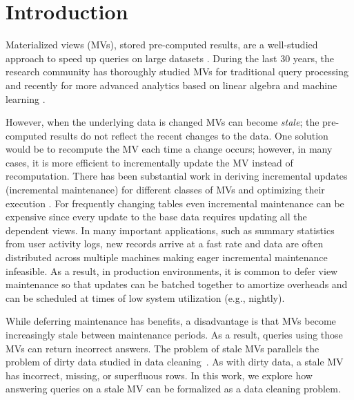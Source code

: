 \vspace{-0.5em}
\section{Introduction}
Materialized views (MVs), stored pre-computed results, are a well-studied approach to speed up queries on large datasets \cite{LarsonY85, gupta1995maintenance, chirkova2011materialized}.
During the last 30 years, the research community has thoroughly studied MVs for traditional query processing and recently for more advanced analytics based on linear algebra and machine learning \cite{nikolic2014linview, zhang2014mat}.

However, when the underlying data is changed MVs can become \emph{stale}; the pre-computed results do not reflect the recent changes to the data. 
One solution would be to recompute the MV each time a change occurs; however, in many cases, it is more efficient to incrementally update the MV instead of recomputation.
There has been substantial work in deriving incremental updates (incremental maintenance) for different classes of MVs and optimizing their execution \cite{chirkova2011materialized, DBLP:journals/vldb/KochAKNNLS14}.
For frequently changing tables even incremental maintenance can be expensive since every update to the base data requires updating all the dependent views.  
In many important applications, such as summary statistics from user activity logs, new records arrive at a fast rate and data are often distributed across multiple machines making eager incremental maintenance infeasible. 
As a result, in production environments, it is common to defer view maintenance \cite{chirkova2011materialized, zhou2007lazy, DBLP:conf/sigmod/ColbyGLMT96} so that updates can be batched together to amortize overheads and can be scheduled at times of low system utilization (e.g., nightly).  

While deferring maintenance  has benefits, a disadvantage is that MVs become increasingly stale between maintenance periods.
As a result, queries using those MVs can return incorrect answers.
The problem of stale MVs parallels the problem of dirty data studied in data cleaning~\cite{rahm2000data}.
As with dirty data, a stale MV has incorrect, missing, or superfluous rows.
In this work, we explore how answering queries on a stale MV can be formalized as a data cleaning problem. 

